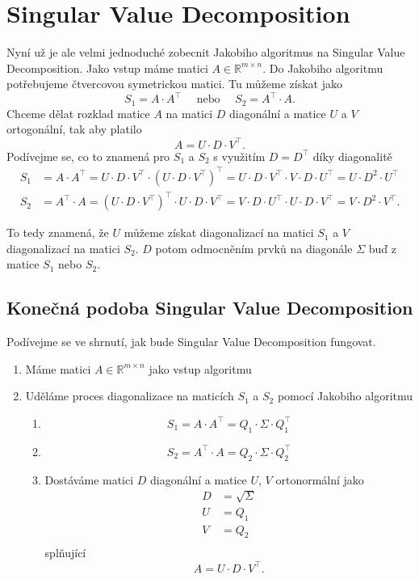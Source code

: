 \documentclass[czech]{article}
\newcommand\R{\ensuremath{\mathbb{R}}}
\begin{document}
\section{Singular Value Decomposition}%
\label{sec:singular_value_decomposition}
Nyní už je ale velmi jednoduché zobecnit Jakobiho algoritmus na Singular Value Decomposition. Jako vstup máme matici $A \in \R^{m \times n}$. Do Jakobiho algoritmu potřebujeme čtvercovou symetrickou matici. Tu můžeme získat jako
\[
	S_{1} = A\cdot A^{\top} \quad \text{ nebo } \quad S_{2} = A^{\top}\cdot A.
\]
Chceme dělat rozklad matice $A$ na matici $D$ diagonální a matice $U$ a $V$ ortogonální, tak aby platilo
\[
	A = U\cdot D\cdot V^{\top}.
\]
Podívejme se, co to znamená pro $S_{1}$ a $S_{2}$ s využitím $D = D^{\top}$ díky diagonalitě
\begin{align*}
	S_{1} & = A\cdot A^{\top} = U\cdot D\cdot V^{\top}\cdot\left( U\cdot D\cdot V^{\top} \right)^{\top} = U\cdot D\cdot V^{\top}\cdot V\cdot D\cdot U^{\top} = U \cdot D^2 \cdot U^{\top}   \\
	S_{2} & = A^{\top}\cdot A = \left( U\cdot D\cdot V^{\top} \right)^{\top} \cdot U\cdot D\cdot V^{\top} = V\cdot D\cdot U^{\top}\cdot U\cdot D\cdot V^{\top} = V \cdot D^2 \cdot V^{\top}
	.\end{align*}

To tedy znamená, že $U$ můžeme získat diagonalizací na matici $S_{1}$ a $V$ diagonalizací na matici $S_{2}$. $D$ potom odmocněním prvků na diagonále $\Sigma$ buď z matice $S_1$ nebo $S_2$.


\subsection{Konečná podoba Singular Value Decomposition}%
\label{sub:konecna_podoba_singular_value_decomposition}
Podívejme se ve shrnutí, jak bude Singular Value Decomposition fungovat.
\begin{enumerate}[label=(\roman*)]
	\item Máme matici $A \in \R^{m\times n}$ jako vstup algoritmu
	\item Uděláme proces diagonalizace na maticích $S_1$ a $S_2$ pomocí Jakobiho algoritmu
	      \begin{enumerate}[label=(\alph*)]
		      \item
		            \[
			            S_1 = A\cdot A^{\top} = Q_{1}\cdot\Sigma\cdot Q_{1}^{\top}
		            \]
		      \item
		            \[
			            S_2 = A^{\top} \cdot A = Q_{2}\cdot\Sigma\cdot Q_{2}^{\top}
		            \]
		      \item Dostáváme matici $D$ diagonální a matice $U$, $V$ ortonormální jako
		            \begin{align*}
			            D & = \sqrt{\Sigma} \\
			            U & = Q_1           \\
			            V & = Q_2           \\
		            \end{align*}
		            splňující
		            \[
			            A = U\cdot D\cdot V^{\top}.
		            \]
	      \end{enumerate}
\end{enumerate}
\end{document}
